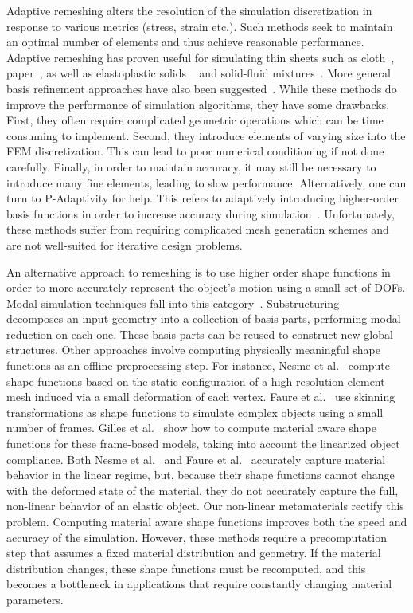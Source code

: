Adaptive remeshing alters the resolution of the simulation discretization in response to various metrics (stress, strain etc.).
Such methods seek to maintain an optimal number of elements and thus achieve reasonable performance.
Adaptive remeshing has proven useful for simulating thin sheets such as cloth~\cite{narain2012}, paper~\cite{narain2013}, as well as elastoplastic solids ~\cite{Wicke:2010} and solid-fluid mixtures~\cite{Clausen2013}.
More general basis refinement approaches have also been suggested~\cite{Debunne2001,Grinspun2002}.
While these methods do improve the performance of simulation algorithms, they have some drawbacks.
First, they often require complicated geometric operations which can be time consuming to implement.
Second, they introduce elements of varying size into the FEM discretization.
This can lead to poor numerical conditioning if not done carefully.
Finally, in order to maintain accuracy, it may still be necessary to introduce many fine elements, leading to slow performance.
Alternatively, one  can turn to P-Adaptivity for help.
This refers to adaptively introducing higher-order basis functions in order to increase accuracy during simulation~\cite{Szabo2004}.
Unfortunately, these methods suffer from requiring complicated mesh generation schemes and are not well-suited for iterative design problems.

An alternative approach to remeshing is to use higher order shape functions in order to more accurately represent the object's motion using a small set of DOFs.
Modal simulation techniques fall into this category~\cite{Shabana1991,Krysl2001,Barbic:subspace:2005}.
Substructuring ~\cite{Barbic2011} decomposes an input geometry into a collection of basis parts, performing modal reduction on each one. These basis parts can be reused to construct new global structures.
Other approaches involve computing physically meaningful shape functions as an offline preprocessing step.
For instance,  Nesme et al.~\cite{Nesme2009} compute shape functions based on the static configuration of a high resolution element mesh induced via a small deformation of each vertex.
Faure et al.~\cite{Gilles2011} use skinning transformations as shape functions to simulate complex objects using a small number of frames.
Gilles et al.~\cite{Faure2011} show how to compute material aware shape functions for these frame-based models, taking into account the linearized object compliance. Both Nesme et al.~\cite{Nesme2009} and Faure et al.~\cite{Faure2011} accurately capture material behavior in the linear regime, but, because their shape functions cannot change with the deformed state of the material, they do not accurately capture the full, non-linear behavior of an elastic object. Our non-linear metamaterials rectify this problem.
Computing material aware shape functions improves both the speed and accuracy of the simulation.
However, these methods require a precomputation step that assumes a fixed material distribution and geometry.
If the material distribution changes, these shape functions must be recomputed, and this becomes a bottleneck in applications that require constantly changing material parameters.  

